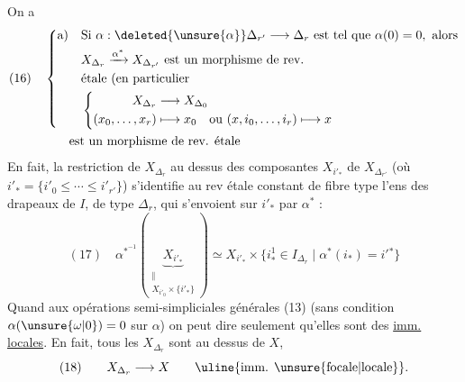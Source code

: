 On a
\[
\begin{aligned}
(16)\quad&
\left\{\begin{aligned}
\text{a)}\quad&\text{Si }\alpha:\deleted{\unsure{\alpha}}\Delta_{r'}\longrightarrow\Delta_r\text{ est tel que }\alpha(0)=0,\text{ alors}\\
&X_{\Delta_r}\xrightarrow{\alpha^*}X_{\Delta_{r'}}\text{ est un morphisme de rev.}\\
&\text{étale (en particulier}\\
&\left\{\begin{aligned}
X_{\Delta_r}&\longrightarrow X_{\Delta_0}\\
(x_0,\ldots,x_r)&\longmapsto x_0\quad\text{ou }(x,i_0,\ldots,i_r)\longmapsto x
\end{aligned}\right.
\end{aligned}\right.\\
&\qquad\text{est un morphisme de rev. étale}
\end{aligned}
\]
En fait, la  restriction de $X_{\Delta_r}$ au
dessus des composantes $X_{i'_*}$  de $X_{\Delta_{r'}}$
(où $i'_* = \{i'_0\leq\cdots\leq i'_{r'}\}$)  s'identifie
au rev étale constant de fibre type l'ens
des drapeaux  de $I$, de type $\Delta_r$, qui
s'envoient sur $i'_*$ par $\alpha^*$ :
\[
(17)\quad\alpha^{*^{-1}}\left(\underbrace{X_{i'_*}}_{\substack{\Vert\\X_{i'_0}\times\{i'_*\}}}\right)
\simeq X_{i'_*}\times\{i^1_*\in I_{\Delta_r}\mid\alpha^*(i_*)=i'{}^*\}
\]
Quand aux opérations semi-simpliciales
générales (13) (sans condition $\alpha(\unsure{\omega|0})=0$ sur
$\alpha$) on peut dire seulement qu'elles sont
des \uline{imm. locales}. En fait, tous les
$X_{\Delta_r}$ sont au dessus de $X$, 
\[
(18)\qquad X_{\Delta_r}\longrightarrow X\qquad\text{\uline{imm. \unsure{focale|locale}}}.
\]
